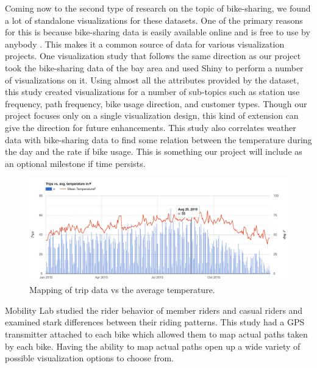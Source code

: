 Coming now to the second type of research on the topic of bike-sharing, we found a lot of standalone visualizations for these datasets. One of the primary reasons for this is because bike-sharing data is easily available online and is free to use by anybody \cite{KaggleData, BikeShareMetro}. This makes it a common source of data for various visualization projects. One visualization study \cite{BayAreaViz} that follows the same direction as our project took the bike-sharing data of the bay area and used Shiny to perform a number of visualizations on it. Using almost all the attributes provided by the dataset, this study created visualizations for a number of sub-topics such as station use frequency, path frequency, bike usage direction, and customer types. Though our project focuses only on a single visualization design, this kind of extension can give the direction for future enhancements. This study also correlates weather data with bike-sharing data to find some relation between the temperature during the day and the rate if bike usage. This is something our project will include as an optional milestone if time persists.
\begin{figure}[h]
	\centering %
	\includegraphics[scale=0.26]{figs/temp.PNG}
	\caption{\footnotesize{Mapping of trip data vs the average temperature. \cite{BayAreaViz}}}
	\label{fig:Weather Chart}
	\captionsetup{justification=centering,margin=1cm}
	\vspace{-10pt}
\end{figure}
\newline
Mobility Lab \cite{MobilityLab} studied the rider behavior of member riders and casual riders and examined stark differences between their riding patterns. This study had a GPS transmitter attached to each bike which allowed them to map actual paths taken by each bike. Having the ability to map actual paths open up a wide variety of possible visualization options to choose from.
